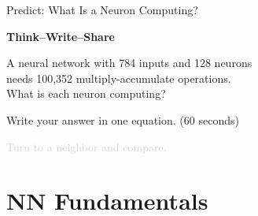\documentclass[aspectratio=169, 12pt]{beamer}
\begin{document}
\begin{frame}{Predict: What Is a Neuron Computing?}

\centering
\vspace{0.6cm}
{\Large\bfseries Think--Write--Share}

\vspace{0.4cm}
{\large A neural network with 784 inputs and 128 neurons\\
needs 100,352 multiply-accumulate operations.\\[0.2cm]
\alert{What is each neuron computing?}}

\vspace{0.4cm}
{\normalsize Write your answer in one equation. \textcolor{midgray}{(60 seconds)}}

\vspace{0.3cm}
{\small\textcolor{lightgray}{Turn to a neighbor and compare.}}

\end{frame}

\section{NN Fundamentals}
\end{document}
